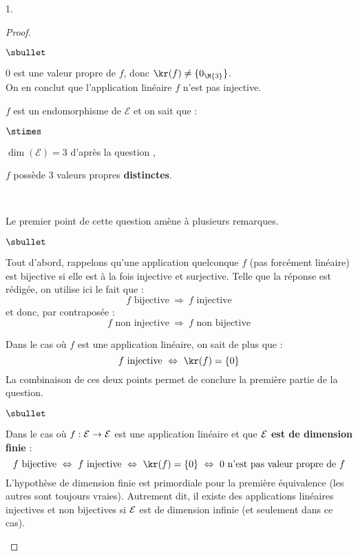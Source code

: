 \begin{noliste}{1.}
\begin{proof}~
 \begin{noliste}{$\sbullet$}
  \item $0$ est une valeur propre de $f$, donc $\kr(f) \neq
      \{0_{\M{3}}\}$.\\
      On en conclut que l'application linéaire $f$ n'est pas
      injective.
  \item $f$ est un endomorphisme de $\mathcal{E}$ et on sait que :
  \begin{noliste}{$\stimes$}
  \item $\dim(\mathcal{E})=3$ d'après la question ,
  \item $f$ possède $3$ valeurs propres {\bf distinctes}.
  \end{noliste}
  ~\\[-1.2cm]
 \end{noliste}
 
 \begin{remark}%
      Le premier point de cette question amène à plusieurs remarques.
      \begin{noliste}{$\sbullet$}
      \item Tout d'abord, rappelons qu'une application quelconque $f$ 
(pas
        forcément linéaire) est bijective si elle est à la fois
        injective et surjective. Telle que la réponse est rédigée, on
        utilise ici le fait que : 
        \[
        \text{$f$ bijective} \ \Rightarrow \ \text{$f$ injective}
        \]
        et donc, par contraposée : 
        \[
        \text{$f$ non injective} \ \Rightarrow \ \text{$f$ non
          bijective}
        \]
        
      \item Dans le cas où $f$ est une application linéaire, on sait
        de plus que : 
        \[
        \text{$f$ injective} \ \Leftrightarrow \ \kr(f) = \{0\}
        \]
        La combinaison de ces deux points permet de conclure la
        première partie de la question.
    \end{noliste}
 \end{remark}
 
 
 \newpage
        
        
 \begin{remark}
   \begin{noliste}{$\sbullet$}
      \item Dans le cas où $f : {\cal E} \to {\cal E}$ est une
        application linéaire et que {\bf ${\cal E}$ est de dimension
          finie} :
        \[
        \text{$f$ bijective} \ \Leftrightarrow \ \text{$f$ injective}
        \ \Leftrightarrow \ \kr(f) = \{0\} \ \Leftrightarrow \
        \text{$0$ n'est pas valeur propre de $f$}
        \]
        L'hypothèse de dimension finie est primordiale pour la
        première équivalence (les autres sont toujours vraies).
        Autrement dit, il existe des applications linéaires injectives
        et non bijectives si ${\cal E}$ est de dimension infinie (et
        seulement dans ce cas).


\end{noliste}
\end{remark}
\end{proof}
\end{noliste}
